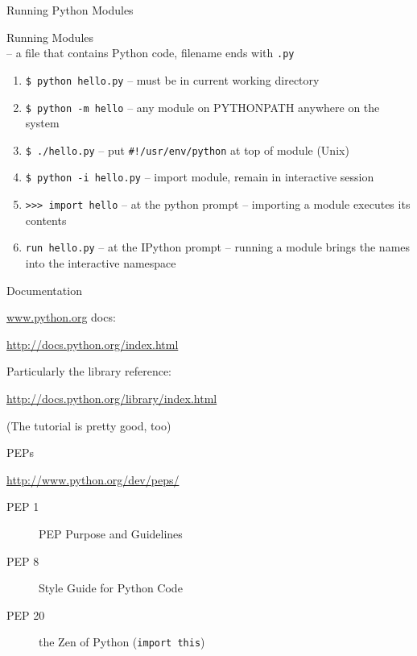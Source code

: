 \documentclass{beamer}
\begin{document}
\begin{frame}[fragile]{Running Python Modules}


{\Large Running Modules}\\[0.05in]
-- a file that contains Python code, filename ends with \verb+.py+

 \begin{enumerate}
    \item \verb+$ python hello.py+  -- must be in current working directory

    \item \verb+$ python -m hello+  -- any module on PYTHONPATH anywhere on the system

    \item \verb+$ ./hello.py+       -- put \verb+#!/usr/env/python+ at top of module (Unix)
   
    \item \verb+$ python -i hello.py+  -- import module, remain in interactive session 

    \item \verb+>>> import hello+    -- at the python prompt -- importing a module executes its contents

    \item \verb+run hello.py+    -- at the IPython prompt -- running a module brings the names into the interactive namespace
\end{enumerate}

\end{frame} 

\begin{frame}[fragile]{Documentation}

{\Large \url{www.python.org} docs:}

\url{http://docs.python.org/index.html}

\vspace{0.25in}
{\Large Particularly the library reference:}

\url{http://docs.python.org/library/index.html}

\vspace{0.25in}
(The tutorial is pretty good, too)

\end{frame} 

\begin{frame}[fragile]{PEPs}

{\large \url{http://www.python.org/dev/peps/} }

\vspace{0.25in}
\begin{description}
  \item[PEP 1]   PEP Purpose and Guidelines
  \item[PEP 8]   Style Guide for Python Code
  \item[PEP 20]  the Zen of Python (\verb+import this+)
\end{description}

\end{frame} 
\end{document}
